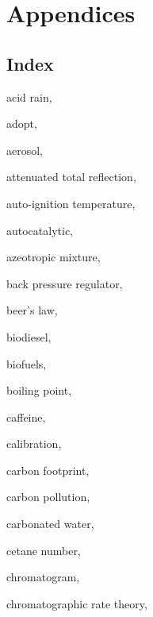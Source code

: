 \part{Appendices}%
\label{sec:Part5}

\chapter{Index} %

\label{AppendixA} %


\begin{theindex}

  \item \lowercase {acid rain}, 
  \item \lowercase {adopt}, 
  \item \lowercase {aerosol}, 
  \item \lowercase {attenuated total reflection}, 
  \item \lowercase {auto-ignition temperature}, 
  \item \lowercase {autocatalytic}, 
  \item \lowercase {azeotropic mixture}, 
  \item \lowercase {back pressure regulator}, 
  \item \lowercase {Beer's law}, 
  \item \lowercase {biodiesel}, 
  \item \lowercase {biofuels}, 
  \item \lowercase {boiling point}, 
  \item \lowercase {caffeine}, 
  \item \lowercase {calibration}, 
  \item \lowercase {carbon footprint}, 
  \item \lowercase {carbon pollution}, 
  \item \lowercase {carbonated water}, 
  \item \lowercase {cetane number}, 
  \item \lowercase {chromatogram}, 
  \item \lowercase {chromatographic rate theory}, 

\end{theindex}
